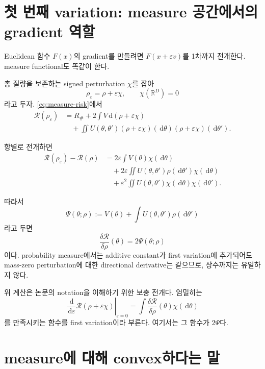 \documentclass[11pt,a4paper,oneside,openany]{memoir}
\newcommand{\R}{\mathbb{R}}
\newcommand{\Risk}{\mathcal{R}}
\newcommand{\dd}{\,\mathrm{d}}
\theoremstyle{definition}
\begin{document}
\section{첫 번째 variation: measure 공간에서의 gradient 역할}

Euclidean 함수 $F(x)$의 gradient를 만들려면 $F(x+\varepsilon v)$를 1차까지 전개한다.
measure functional도 똑같이 한다.

총 질량을 보존하는 signed perturbation $\chi$를 잡아
\[
  \rho_\varepsilon=\rho+\varepsilon\chi,
  \qquad \chi(\R^D)=0
\]
라고 두자. \eqref{eq:measure-risk}에서
\begin{align*}
\Risk(\rho_\varepsilon)
&=R_\#+2\int V\dd(\rho+\varepsilon\chi)\\
&\quad+\iint U(\theta,\theta')
   (\rho+\varepsilon\chi)(\dd\theta)
   (\rho+\varepsilon\chi)(\dd\theta').
\end{align*}

항별로 전개하면
\begin{align*}
\Risk(\rho_\varepsilon)-\Risk(\rho)
&=2\varepsilon\int V(\theta)\chi(\dd\theta)\\
&\quad+2\varepsilon\iint U(\theta,\theta')
      \rho(\dd\theta')\chi(\dd\theta)\\
&\quad+\varepsilon^2\iint U(\theta,\theta')
      \chi(\dd\theta)\chi(\dd\theta').
\end{align*}

따라서
\[
  \Psi(\theta;\rho)
  :=V(\theta)+\int U(\theta,\theta')\rho(\dd\theta')
\]
라고 두면
\begin{equation}
\boxed{
  \frac{\delta\Risk}{\delta\rho}(\theta)
  =2\Psi(\theta;\rho)
}
\label{eq:first-variation}
\end{equation}
이다. probability measure에서는 additive constant가 first variation에 추가되어도
mass-zero perturbation에 대한 directional derivative는 같으므로, 상수까지는 유일하지 않다.

\begin{suppbox}
위 계산은 논문의 notation을 이해하기 위한 보충 전개다. 엄밀히는
\[
\left.\frac{\dd}{\dd\varepsilon}\Risk(\rho+\varepsilon\chi)\right|_{\varepsilon=0}
=\int \frac{\delta\Risk}{\delta\rho}(\theta)\chi(\dd\theta)
\]
를 만족시키는 함수를 first variation이라 부른다. 여기서는 그 함수가 $2\Psi$다.
\end{suppbox}

\section{measure에 대해 convex하다는 말}
\end{document}
